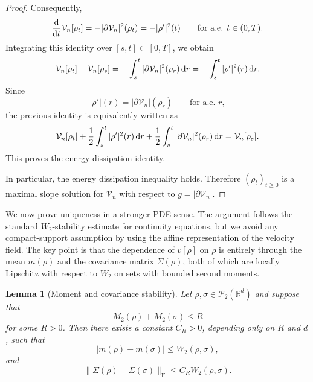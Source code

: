 \documentclass[11pt,reqno]{amsart}
\numberwithin{figure}{section}
\def\d {{\partial}}
\def\d{\mathrm{d}}
\renewcommand{\d}{  {\textup{d}} }
\newtheorem{lemma}{Lemma}[section]
\begin{document}
\begin{proof}
Consequently,
\[
\frac{\d}{\d t}\mathcal V_n[\rho_t]
=
-|\partial\mathcal V_n|^2(\rho_t)
=
-|\rho'|^2(t)
\qquad\text{for a.e. }t\in(0,T).
\]
Integrating this identity over $[s,t]\subset[0,T]$, we obtain
\[
\mathcal V_n[\rho_t]-\mathcal V_n[\rho_s]
=
-\int_s^t |\partial\mathcal V_n|^2(\rho_r)\,\d r
=
-\int_s^t |\rho'|^2(r)\,\d r.
\]
Since
\[
|\rho'|(r)=|\partial\mathcal V_n|(\rho_r)
\qquad\text{for a.e. }r,
\]
the previous identity is equivalently written as
\[
\mathcal V_n[\rho_t]
+
\frac12\int_s^t |\rho'|^2(r)\,\d r
+
\frac12\int_s^t |\partial\mathcal V_n|^2(\rho_r)\,\d r
=
\mathcal V_n[\rho_s].
\]
This proves the energy dissipation identity.

In particular, the energy dissipation inequality holds. Therefore
$(\rho_t)_{t\ge0}$ is a maximal slope solution for $\mathcal V_n$ with respect
to $g=|\partial\mathcal V_n|$.
\end{proof}



We now prove uniqueness in a stronger PDE sense. The argument follows the
standard $W_2$-stability estimate for continuity equations, but we avoid any
compact-support assumption by using the affine representation of the velocity
field. The key point is that the dependence of $v[\rho]$ on $\rho$ is entirely
through the mean $m(\rho)$ and the covariance matrix $\Sigma(\rho)$, both of
which are locally Lipschitz with respect to $W_2$ on sets with bounded second
moments.

\begin{lemma}[Moment and covariance stability]\label{lem:moment-covariance-stability}
Let $\rho,\sigma\in\mathcal P_2(\mathbb R^d)$ and suppose that
\[
M_2(\rho)+M_2(\sigma)\le R
\]
for some $R>0$. Then there exists a constant $C_R>0$, depending only on $R$
and $d$, such that
\[
|m(\rho)-m(\sigma)|\le W_2(\rho,\sigma),
\]
and
\[
\|\Sigma(\rho)-\Sigma(\sigma)\|_{\mathrm F}
\le C_R W_2(\rho,\sigma).
\]
\end{lemma}
\end{document}

